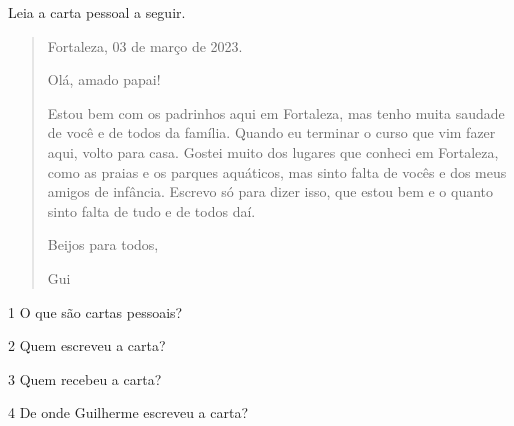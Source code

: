 
Leia a carta pessoal a seguir.




\begin{quote}
\begin{flushright}
Fortaleza, 03 de março de 2023.
\end{flushright}

Olá, amado papai!

Estou bem com os padrinhos aqui em Fortaleza, mas tenho muita saudade de
você e de todos da família. Quando eu terminar o curso que vim fazer
aqui, volto para casa. Gostei muito dos lugares que conheci em
Fortaleza, como as praias e os parques aquáticos, mas sinto falta de
vocês e dos meus amigos de infância. Escrevo só para dizer isso, que
estou bem e o quanto sinto falta de tudo e de todos daí.

\begin{flushright}
Beijos para todos,

Gui
\end{flushright}
\end{quote}


\num{1} O que são cartas pessoais?


\num{2} Quem escreveu a carta?


\num{3} Quem recebeu a carta?


\num{4} De onde Guilherme escreveu a carta?

